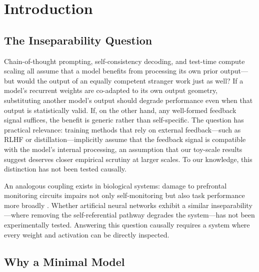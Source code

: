 \documentclass[10pt]{article}
\begin{document}
\section{Introduction}

\subsection{The Inseparability Question}

Chain-of-thought prompting, self-consistency decoding, and test-time compute scaling all assume that a model benefits from processing its own prior output---but would the output of an equally competent stranger work just as well? If a model's recurrent weights are co-adapted to its own output geometry, substituting another model's output should degrade performance even when that output is statistically valid. If, on the other hand, any well-formed feedback signal suffices, the benefit is generic rather than self-specific. The question has practical relevance: training methods that rely on external feedback---such as RLHF or distillation---implicitly assume that the feedback signal is compatible with the model's internal processing, an assumption that our toy-scale results suggest deserves closer empirical scrutiny at larger scales. To our knowledge, this distinction has not been tested causally.

An analogous coupling exists in biological systems: damage to prefrontal monitoring circuits impairs not only self-monitoring but also task performance more broadly \citep{fleming2012neural}. Whether artificial neural networks exhibit a similar inseparability---where removing the self-referential pathway degrades the system---has not been experimentally tested. Answering this question causally requires a system where every weight and activation can be directly inspected.

\subsection{Why a Minimal Model}
\end{document}
